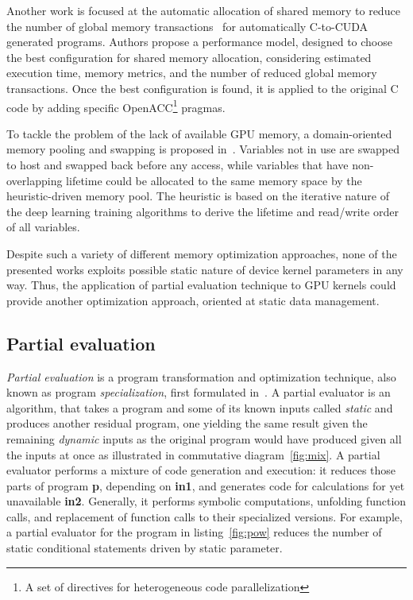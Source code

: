 Another work is focused at the automatic allocation of shared memory to reduce the number of global memory transactions~\cite{AutomaticSharedMem} for automatically C-to-CUDA generated programs.
Authors propose a performance model, designed to choose the best configuration for shared memory allocation, considering estimated execution time, memory metrics, and the number of reduced global memory transactions.
Once the best configuration is found, it is applied
to the original C code by adding specific OpenACC\footnote{A set of directives for heterogeneous code parallelization} pragmas.

To tackle the problem of the lack of available GPU memory, a domain-oriented memory pooling and swapping is proposed in~\cite{zhang2019efficient}. Variables not in use are swapped to host and swapped back before any access, while variables that have non-overlapping lifetime could be allocated to the same memory space by the heuristic-driven memory pool. The heuristic is based on the iterative nature of the deep learning training algorithms to derive the lifetime and read/write order of all variables.

Despite such a variety of different memory optimization approaches, none of the presented works exploits possible static nature of device kernel parameters in any way. Thus, the application of partial evaluation technique to GPU kernels could provide another optimization approach, oriented at static data management.

\subsection{Partial evaluation}\label{PEsurvey}
\emph{Partial evaluation} is a program transformation and optimization technique, also known as program \emph{specialization}, first formulated in~\cite{Kleene1952-KLEITM}.
A partial evaluator is an algorithm, that takes a program and some of its known inputs called \emph{static} and produces another residual program, one yielding the same result given the remaining \emph{dynamic} inputs as the original program would have produced given all the inputs at once as illustrated in commutative diagram~\ref{fig:mix}.
A partial evaluator performs a mixture of code generation and execution: it reduces those parts of program \textbf{p}, depending on \textbf{in1}, and generates code for calculations for yet unavailable \textbf{in2}.
Generally, it performs symbolic computations, unfolding function calls, and replacement of function calls to their specialized versions.
For example, a partial evaluator for the program in listing~\ref{fig:pow} reduces the number of static conditional statements driven by static parameter. 

